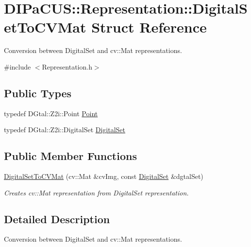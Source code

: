 \hypertarget{structDIPaCUS_1_1Representation_1_1DigitalSetToCVMat}{}\section{D\+I\+Pa\+C\+US\+:\+:Representation\+:\+:Digital\+Set\+To\+C\+V\+Mat Struct Reference}
\label{structDIPaCUS_1_1Representation_1_1DigitalSetToCVMat}


Conversion between Digital\+Set and cv\+::\+Mat representations.  




{\ttfamily \#include $<$Representation.\+h$>$}

\subsection*{Public Types}
\begin{DoxyCompactItemize}
\item 
typedef D\+Gtal\+::\+Z2i\+::\+Point \mbox{\hyperlink{structDIPaCUS_1_1Representation_1_1DigitalSetToCVMat_aac2a2eb35e461cdd0979514ad82b37ec}{Point}}
\item 
typedef D\+Gtal\+::\+Z2i\+::\+Digital\+Set \mbox{\hyperlink{structDIPaCUS_1_1Representation_1_1DigitalSetToCVMat_a476ca922b6635faab97aa112341663a9}{Digital\+Set}}
\end{DoxyCompactItemize}
\subsection*{Public Member Functions}
\begin{DoxyCompactItemize}
\item 
\mbox{\hyperlink{structDIPaCUS_1_1Representation_1_1DigitalSetToCVMat_ae8d37dafdb5e92009461c08ebb5c3bb1}{Digital\+Set\+To\+C\+V\+Mat}} (cv\+::\+Mat \&cv\+Img, const \mbox{\hyperlink{structDIPaCUS_1_1Representation_1_1DigitalSetToCVMat_a476ca922b6635faab97aa112341663a9}{Digital\+Set}} \&dgtal\+Set)
\begin{DoxyCompactList}\small\item\em Creates cv\+::\+Mat representation from Digital\+Set representation. \end{DoxyCompactList}\end{DoxyCompactItemize}


\subsection{Detailed Description}
Conversion between Digital\+Set and cv\+::\+Mat representations. 



